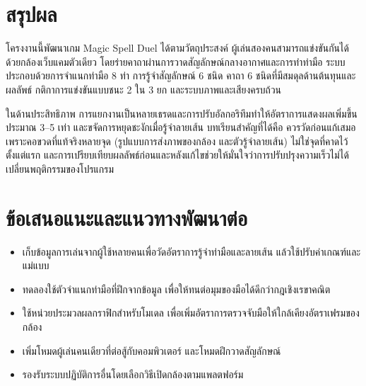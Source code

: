 \documentclass[12pt,a4paper]{report}
\begin{document}
\section{สรุปผล}
โครงงานนี้พัฒนาเกม Magic Spell Duel ได้ตามวัตถุประสงค์ ผู้เล่นสองคนสามารถแข่งขันกันได้ด้วยกล้องเว็บแคมตัวเดียว
โดยร่ายคาถาผ่านการวาดสัญลักษณ์กลางอากาศและการทำท่ามือ ระบบประกอบด้วยการจำแนกท่ามือ 8 ท่า การรู้จำสัญลักษณ์ 6 ชนิด
คาถา 6 ชนิดที่มีสมดุลด้านต้นทุนและผลลัพธ์ กติกาการแข่งขันแบบชนะ 2 ใน 3 ยก และระบบภาพและเสียงครบถ้วน

ในด้านประสิทธิภาพ การแยกงานเป็นหลายเธรดและการปรับอัลกอริทึมทำให้อัตราการแสดงผลเพิ่มขึ้นประมาณ 3--5 เท่า
และขจัดการหยุดชะงักเมื่อรู้จำลายเส้น บทเรียนสำคัญที่ได้คือ ควรวัดก่อนแก้เสมอ
เพราะคอขวดที่แท้จริงหลายจุด (รูปแบบการส่งภาพของกล้อง และตัวรู้จำลายเส้น) ไม่ใช่จุดที่คาดไว้ตั้งแต่แรก
และการเปรียบเทียบผลลัพธ์ก่อนและหลังแก้ไขช่วยให้มั่นใจว่าการปรับปรุงความเร็วไม่ได้เปลี่ยนพฤติกรรมของโปรแกรม

\section{ข้อเสนอแนะและแนวทางพัฒนาต่อ}
\begin{itemize}[leftmargin=2cm]
  \item เก็บข้อมูลการเล่นจากผู้ใช้หลายคนเพื่อวัดอัตราการรู้จำท่ามือและลายเส้น แล้วใช้ปรับค่าเกณฑ์และแม่แบบ
  \item ทดลองใช้ตัวจำแนกท่ามือที่ฝึกจากข้อมูล เพื่อให้ทนต่อมุมของมือได้ดีกว่ากฎเชิงเรขาคณิต
  \item ใช้หน่วยประมวลผลกราฟิกสำหรับโมเดล เพื่อเพิ่มอัตราการตรวจจับมือให้ใกล้เคียงอัตราเฟรมของกล้อง
  \item เพิ่มโหมดผู้เล่นคนเดียวที่ต่อสู้กับคอมพิวเตอร์ และโหมดฝึกวาดสัญลักษณ์
  \item รองรับระบบปฏิบัติการอื่นโดยเลือกวิธีเปิดกล้องตามแพลตฟอร์ม
\end{itemize}
\end{document}

